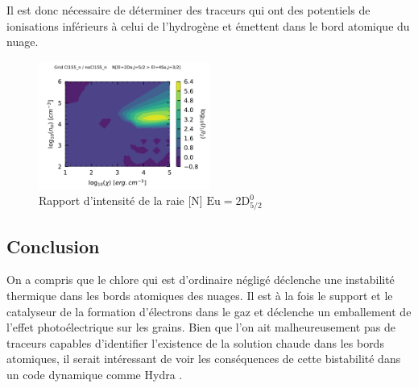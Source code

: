 Il est donc nécessaire de déterminer des traceurs qui ont des potentiels de ionisations inférieurs à celui de l'hydrogène et émettent dans le bord atomique du nuage. 

\begin{figure}[!h]
    \centering \includegraphics[trim = {0 0 0 1cm},clip,width=0.5\textwidth]{figure/Cl/gridModelEmiss/map_Cl155_n_noCl155_nI_N.pdf}
    \caption{Rapport d'intensité de la raie [N] $\mathrm{Eu}=2\mathrm{D}^\mathrm{0}_{5/2}$}
    \label{fig:Cl:gridModelEmiss:N}
\end{figure}


\subsection*{Conclusion}

On a compris que le chlore qui est d'ordinaire négligé déclenche une instabilité thermique dans les bords atomiques des nuages. Il est à la fois le support et le catalyseur de la formation d'électrons dans le gaz et déclenche un emballement de l'effet photoélectrique sur les grains. Bien que l'on ait malheureusement pas de traceurs capables d'identifier l'existence de la solution chaude dans les bords atomiques, il serait intéressant de voir les conséquences de cette bistabilité dans un code dynamique comme Hydra \cite{Bron2018}.





